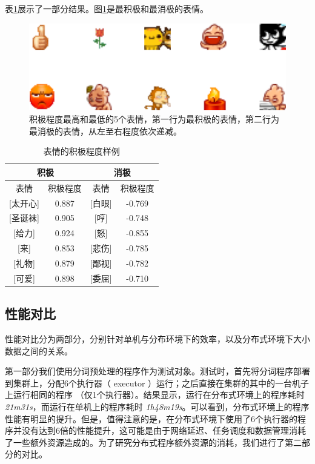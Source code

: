\documentclass[12pt, oneside]{article}
\begin{document}
\begin{spacing}{1.5}
\begin{CJK}{UTF8}{gbsn}
表\ref{tbl:weighted_expreesions}展示了一部分结果。图\ref{fig:weighted_expressions_top5}是最积极和最消极的表情。

\begin{figure}
	\centering
	\includegraphics[width=0.35\linewidth]{../result/charts/weighted_expressions_top5}
	\caption{积极程度最高和最低的5个表情，第一行为最积极的表情，第二行为最消极的表情，从左至右程度依次递减。}
	\label{fig:weighted_expressions_top5}
\end{figure}

\begin{table}[]
\centering
\begin{tabular}{|c|c|c|c|}
\hline
\multicolumn{2}{|c|}{积极} & \multicolumn{2}{c|}{消极} \\ \hline
表情            & 积极程度     & 表情          & 积极程度      \\ \hline
{[}太开心{]}     & 0.887    & {[}白眼{]}    & -0.769    \\ \hline
{[}圣诞袜{]}     & 0.905    & {[}哼{]}     & -0.748    \\ \hline
{[}给力{]}      & 0.924    & {[}怒{]}     & -0.855    \\ \hline
{[}来{]}       & 0.853    & {[}悲伤{]}    & -0.785    \\ \hline
{[}礼物{]}      & 0.879    & {[}鄙视{]}    & -0.782    \\ \hline
{[}可爱{]}      & 0.898    & {[}委屈{]}    & -0.710    \\ \hline
\end{tabular}
\caption{表情的积极程度样例}
\label{tbl:weighted_expreesions}
\end{table}

\subsection{性能对比}
性能对比分为两部分，分别针对单机与分布环境下的效率，以及分布式环境下大小数据之间的关系。

第一部分我们使用分词预处理的程序作为测试对象。测试时，首先将分词程序部署到集群上，分配6个执行器（ executor ）运行；之后直接在集群的其中的一台机子上运行相同的程序 （仅1个执行器）。结果显示，运行在分布式环境上的程序耗时 {\it 21m31s}，而运行在单机上的程序耗时 {\it 1h48m19s}。可以看到，分布式环境上的程序性能有明显的提升。但是，值得注意的是，在分布式环境下使用了6个执行器的程序并没有达到6倍的性能提升，这可能是由于网络延迟、任务调度和数据管理消耗了一些额外资源造成的。为了研究分布式程序额外资源的消耗，我们进行了第二部分的对比。


\end{CJK}
\end{spacing}
\end{document}
